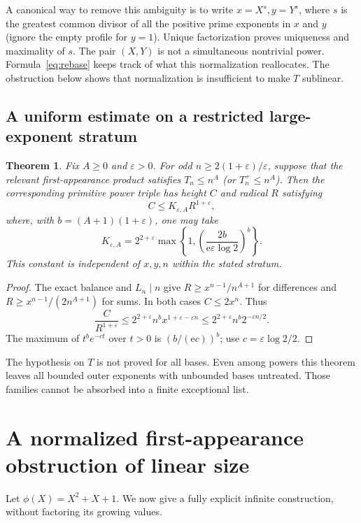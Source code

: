 \documentclass[11pt]{article}
\newtheorem{theorem}{Theorem}[section]
\theoremstyle{definition}\newtheorem{definition}[theorem]{Definition}
\theoremstyle{remark}\newtheorem{remark}[theorem]{Remark}
\begin{document}
A canonical way to remove this ambiguity is to write
$x=X^s,y=Y^s$, where $s$ is the greatest common divisor of all the positive
prime exponents in $x$ and $y$ (ignore the empty profile for $y=1$).
Unique factorization proves uniqueness and maximality of $s$. The pair
$(X,Y)$ is not a simultaneous nontrivial power. Formula~\eqref{eq:rebase}
keeps track of what this normalization reallocates. The obstruction below
shows that normalization is insufficient to make $T$ sublinear.

\subsection{A uniform estimate on a restricted large-exponent stratum}
\begin{theorem}\label{thm:stratum}
Fix $A\ge0$ and $\varepsilon>0$. For odd
$n\ge 2(1+\varepsilon)/\varepsilon$, suppose that the relevant
first-appearance product satisfies $T_n\le n^A$ (or $T_n^+\le n^A$).
Then the corresponding primitive power triple has height $C$ and radical
$R$ satisfying
\[
C\le K_{\varepsilon,A}R^{1+\varepsilon},
\]
where, with $b=(A+1)(1+\varepsilon)$, one may take
\[
K_{\varepsilon,A}=2^{2+\varepsilon}
\max\left\{1,\left(\frac{2b}{\mathrm e\varepsilon\log 2}\right)^b\right\}.
\]
This constant is independent of $x,y,n$ within the stated stratum.
\end{theorem}
\begin{proof}
The exact balance and $L_n\mid n$ give $R\ge x^{n-1}/n^{A+1}$ for
differences and $R\ge x^{n-1}/(2n^{A+1})$ for sums. In both cases
$C\le2x^n$. Thus
\[
\frac{C}{R^{1+\varepsilon}}
\le2^{2+\varepsilon}n^b x^{1+\varepsilon-\varepsilon n}
\le2^{2+\varepsilon}n^b2^{-\varepsilon n/2}.
\]
The maximum of $t^b e^{-ct}$ over $t>0$ is $(b/(\mathrm e c))^b$;
use $c=\varepsilon\log2/2$.
\end{proof}
The hypothesis on $T$ is not proved for all bases. Even among powers this
theorem leaves all bounded outer exponents with unbounded bases untreated.
Those families cannot be absorbed into a finite exceptional list.

\section{A normalized first-appearance obstruction of linear size}
Let $\phi(X)=X^2+X+1$. We now give a fully explicit infinite construction,
without factoring its growing values.
\end{document}

